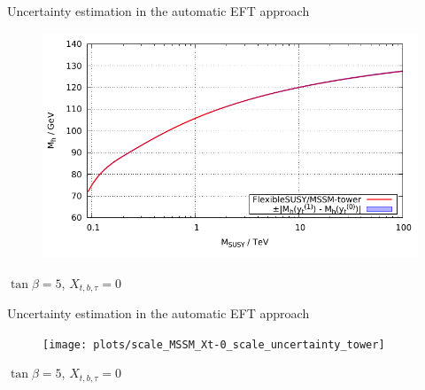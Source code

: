 \documentclass[hyperref={pdfpagelabels=false},ngerman]{beamer}
\newcommand{\eh}[1]{\,\mathsf{#1}}
\begin{document}
\begin{frame}{Uncertainty estimation in the automatic EFT approach}
  \begin{figure}
    \centering
    \includegraphics[width=\textwidth]{plots/scale_MSSM_uncertainty_tower_yt}
  \end{figure}
  $\tan\beta = 5$, $X_{t,b,\tau} = 0$
\end{frame}


\begin{frame}{Uncertainty estimation in the automatic EFT approach}
  \begin{figure}
    \centering
    \texttt{[image: plots/scale\_MSSM\_Xt-0\_scale\_uncertainty\_tower]}
  \end{figure}
  $\tan\beta = 5$, $X_{t,b,\tau} = 0$
\end{frame}


\end{document}
